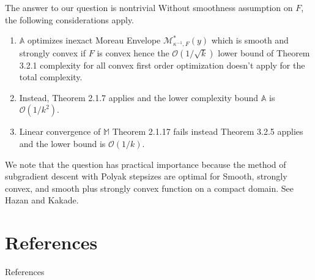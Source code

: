 \documentclass[11pt]{beamer}
\theoremstyle{definition}
\begin{document}
        \begin{frame}{The answer to our question is nontrivial}
            Without smoothness assumption on $F$, the following considerations apply. 
            \begin{enumerate}
                \item $\mathbb A$ optimizes inexact Moreau Envelope $\mathcal M^*_{\kappa^{-1}, F}(y)$ which is smooth and strongly convex if $F$ is convex hence the $\mathcal O(1/\sqrt{k})$ lower bound of Theorem 3.2.1 \cite{nesterov_lectures_2018} complexity for all convex first order optimization doesn't apply for the total complexity.  
                \item Instead, Theorem 2.1.7 \cite{nesterov_lectures_2018} applies and the lower complexity bound $\mathbb A$ is $\mathcal O(1/k^2)$. 
                \item Linear convergence of $\mathbb M$ Theorem 2.1.17 fails instead Theorem 3.2.5 applies and the lower bound is $\mathcal O(1/k)$. 
            \end{enumerate}
            We note that the question has practical importance because the method of subgradient descent with Polyak stepsizes are optimal for Smooth, strongly convex, and smooth plus strongly convex function on a compact domain. See Hazan and Kakade\cite{hazan_revisiting_2022}. 
        \end{frame}

\section{References}
    \begin{frame}[allowframebreaks]{References}
        
    \end{frame}
\end{document}
